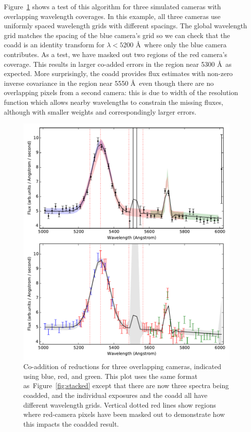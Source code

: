 \documentclass[12pt]{article}
\providecommand{\fig}[1]{Figure~\ref{fig:#1}}
\begin{document}
\fig{global} shows a test of this algorithm for three simulated cameras with overlapping wavelength coverages. In this example, all three cameras use uniformly spaced wavelength grids with different spacings.  The global wavelength grid matches the spacing of the blue camera's grid so we can check that the coadd is an identity transform for $\lambda < 5200$ \AA\ where only the blue camera contributes. As a test, we have masked out two regions of the red camera's coverage. This results in larger co-added errors in the region near 5300 \AA\, as expected. More surprisingly, the coadd provides flux estimates with non-zero inverse covariance in the region near 5550 \AA\, even though there are no overlapping pixels from a second camera: this is due to width of the resolution function which allows nearby wavelengths to constrain the missing fluxes, although with smaller weights and correspondingly larger errors.

\begin{figure}[htb]
\begin{center}
\includegraphics[width=5.5in]{fig/global}
\caption{Co-addition of reductions for three overlapping cameras, indicated using blue, red, and green. This plot uses the same format as~\fig{stacked} except that there are now three spectra being coadded, and the individual exposures and the coadd all have different wavelength grids. Vertical dotted red lines show regions where red-camera pixels have been masked out to demonstrate how this impacts the coadded result.}
\label{fig:global}
\end{center}
\end{figure}
\end{document}
